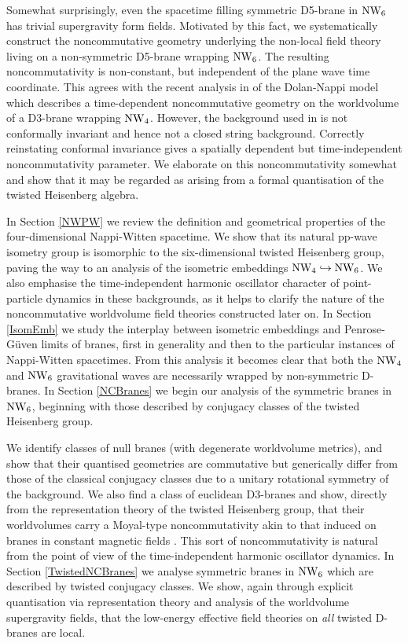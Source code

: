 Somewhat surprisingly, even the spacetime filling symmetric D5-brane in $\operatorname{NW}_6$
has trivial supergravity form fields. Motivated by this fact, we systematically
construct the noncommutative geometry underlying the non-local field theory
living on a non-symmetric D5-brane wrapping $\operatorname{NW}_6$. The resulting
noncommutativity is non-constant, but independent of the plane wave time
coordinate. This agrees with the recent analysis in \cite{HT1} of the
Dolan-Nappi model \cite{DN1} which describes a time-dependent noncommutative
geometry on the worldvolume of a D3-brane wrapping $\operatorname{NW}_4$. However, the
background used in \cite{DN1} is not conformally invariant and hence not a
closed string background. Correctly reinstating conformal invariance \cite{HT1}
gives a spatially dependent but time-independent noncommutativity parameter. We
elaborate on this noncommutativity somewhat and show that it may be regarded as
arising from a formal quantisation of the twisted Heisenberg algebra.

In Section \ref{NWPW} we review the definition and geometrical properties of the
four-dimensional Nappi-Witten spacetime. We show that its natural pp-wave
isometry group is isomorphic to the six-dimensional twisted Heisenberg group,
paving the way to an analysis of the isometric embeddings
$\operatorname{NW}_4 \hookrightarrow \operatorname{NW}_6$. We also emphasise the time-independent harmonic
oscillator character of point-particle dynamics in these backgrounds, as it
helps to clarify the nature of the noncommutative worldvolume field theories
constructed later on. In Section \ref{IsomEmb} we study the interplay between
isometric embeddings and Penrose-G\"uven limits of branes, first in generality
and then to the particular instances of Nappi-Witten spacetimes. From this
analysis it becomes clear that both the $\operatorname{NW}_4$ and $\operatorname{NW}_6$ gravitational waves
are necessarily wrapped by non-symmetric D-branes. In Section \ref{NCBranes} we
begin our analysis of the symmetric branes in $\operatorname{NW}_6$, beginning with those
described by conjugacy classes of the twisted Heisenberg group.

We identify classes of null branes (with degenerate worldvolume metrics), and
show that their quantised geometries are commutative but generically differ from
those of the classical conjugacy classes due to a unitary rotational symmetry of
the background. We also find a class of euclidean D3-branes and show, directly
from the representation theory of the twisted Heisenberg group, that their
worldvolumes carry a Moyal-type noncommutativity akin to that induced on branes
in constant magnetic fields \cite{DNek1,SW1,Sz1,Sz2}. This sort of
noncommutativity is natural from the point of view of the time-independent
harmonic oscillator dynamics. In Section \ref{TwistedNCBranes} we analyse
symmetric branes in $\operatorname{NW}_6$ which are described by twisted conjugacy classes. We
show, again through explicit quantisation via representation theory and analysis
of the worldvolume supergravity fields, that the low-energy effective field
theories on {\it all} twisted D-branes are local.

